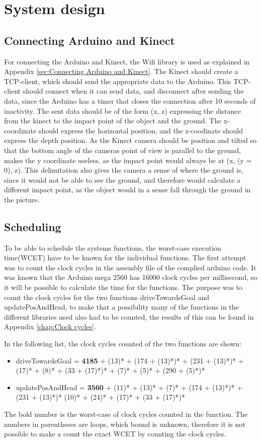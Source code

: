 \section{System design}
\label{sec:i3System design}

\subsection{Connecting Arduino and Kinect}
\label{sec:i3Connecting Arduino and Kinect system design}
For connecting the Arduino and Kinect, the Wifi library is used as explained in Appendix \ref{sec:Connecting Arduino and Kinect}. The Kinect should create a TCP-client, which should send the appropriate data to the Arduino. This TCP-client should connect when it can send data, and disconnect after sending the data, since the Arduino has a timer that closes the connection after 10 seconds of inactivity. The sent data should be of the form (x, z) expressing the distance from the kinect to the impact point of the object and the ground. The x-coordinate should express the horizontal position, and the z-coodinate should express the depth position. As the Kinect camera should be position and tilted so that the bottom angle of the cameras point of view is parallel to the ground, makes the y coordinate useless, as the impact point would always be at (x, (y = 0), z). This delimitation also gives the camera a sense of where the ground is, since it would not be able to see the ground, and therefore would calculate a different impact point, as the object would in a sense fall through the ground in the picture. 

\subsection{Scheduling}
\label{sec:i3Scheduling}
To be able to schedule the systems functions, the worst-case execution time(WCET) have to be known for the individual functions. The first attempt was to count the clock cycles in the assembly file of the complied arduino code. It was known that the Arduino mega 2560 has 16000 clock cycles per millisecond, so it will be possible to calculate the time for the functions. The purpose was to count the clock cycles for the two functions driveTowardsGoal and updatePosAndHead, to make that a possibility many of the functions in the different libraries used also had to be counted, the results of this can be found in Appendix \ref{chap:Clock cycles}.

In the following list, the clock cycles counted of the two functions are shown:
\begin{itemize}
	\item driveTowardsGoal = \textbf{4185} + (13)* + (174 + (13)*)* + (231 + (13)*)* + (17)* + (8)* + (33 + (17)*)* + (7)* + (5)* + (290 + (5)*)*
	\item updatePosAndHead = \textbf{3560} + (11)* + (13)* + (7)* + (174 + (13)*)* + (231 + (13)*)* (10)* + (24)* + (17)* + (33 + (17)*)*
\end{itemize}
The bold number is the worst-case of clock cycles counted in the function. The numbers in parentheses are loops, which bound is unknown, therefore it is not possible to make a count the exact WCET by counting the clock cycles.

